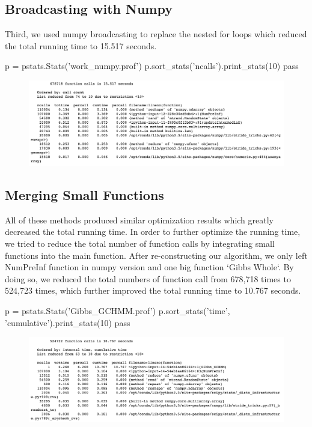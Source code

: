 \documentclass{article} %
\begin{document}
\subsection{Broadcasting with Numpy}
Third, we used numpy broadcasting to replace the nested for loops which reduced the total running time to 15.517 seconds.
\begin{python}
p = pstats.Stats('work_numpy.prof')
p.sort_stats('ncalls').print_stats(10)
pass
\end{python}
\begin{figure}[htpb]
\centering
\includegraphics[width=160mm]{Gibbs_numpy.png}
\end{figure}

\subsection{Merging Small Functions}
All of these methods produced similar optimization results which greatly decreased the total running time. In order to further optimize the running time, we tried to reduce the total number of function calls by integrating small functions into the main function. After re-constructing our algorithm, we only left NumPreInf function in numpy version and one big function `Gibbs Whole`. By doing so, we reduced the total numbers of function call from 678,718 times to 524,723 times, which further improved the total running time to 10.767 seconds.

\begin{python}
p = pstats.Stats('Gibbs_GCHMM.prof')
p.sort_stats('time', 'cumulative').print_stats(10)
pass
\end{python}
\begin{figure}[htpb]
\centering
\includegraphics[width=160mm]{Gibbs_GCHMM.png}
\end{figure}
\end{document}

